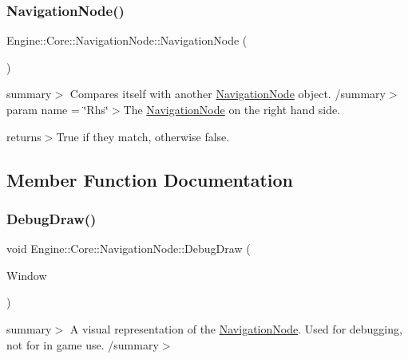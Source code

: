 \subsubsection{\texorpdfstring{Navigation\+Node()}{NavigationNode()}}
{\footnotesize\ttfamily Engine\+::\+Core\+::\+Navigation\+Node\+::\+Navigation\+Node (\begin{DoxyParamCaption}{ }\end{DoxyParamCaption})\hspace{0.3cm}{\ttfamily [default]}}

summary$>$ Compares itself with another \hyperlink{struct_engine_1_1_core_1_1_navigation_node}{Navigation\+Node} object. /summary$>$ param name = \char`\"{}\+Rhs\char`\"{}$>$The \hyperlink{struct_engine_1_1_core_1_1_navigation_node}{Navigation\+Node} on the right hand side.

returns$>$True if they match, otherwise false.

\subsection{Member Function Documentation}
\mbox{\label{struct_engine_1_1_core_1_1_navigation_node_a453d05d915929841a1f3d8f228996d37}} 
\subsubsection{\texorpdfstring{Debug\+Draw()}{DebugDraw()}}
{\footnotesize\ttfamily void Engine\+::\+Core\+::\+Navigation\+Node\+::\+Debug\+Draw (\begin{DoxyParamCaption}\item[{shared\+\_\+ptr$<$ Render\+Window $>$}]{Window }\end{DoxyParamCaption})}

summary$>$ A visual representation of the \hyperlink{struct_engine_1_1_core_1_1_navigation_node}{Navigation\+Node}. Used for debugging, not for in game use. /summary$>$ \mbox{\label{struct_engine_1_1_core_1_1_navigation_node_a4e049fbcda1bb269303da91692d05033}} 
